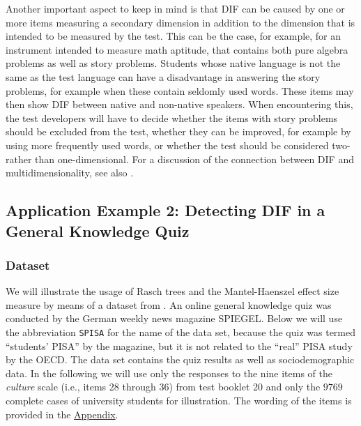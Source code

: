 \documentclass[doc,floatsintext,natbib]{apa7}
\begin{document}
Another important aspect to keep in mind is that DIF can be caused by one or more items measuring a secondary dimension in addition to the dimension that is intended to be measured by the test. This can be the case, for example, for an instrument intended to measure math aptitude, that contains both pure algebra problems as well as story problems. Students whose native language is not the same as the test language can have a disadvantage in answering the story problems, for example when these contain seldomly used words. These items may then show DIF between native and non-native speakers. When encountering this, the test developers will have to decide whether the items with story problems should be excluded from the test, whether they can be improved, for example by using more frequently used words, or whether the test should be considered two- rather than one-dimensional. For a discussion of the connection between DIF and multidimensionality, see also \cite{Ack:1992,Stretal:2021:APM}.



\subsection{Application Example 2: Detecting DIF in a General Knowledge Quiz}
\label{sec:TutorialRasch}


\subsubsection{Dataset}

We will illustrate the usage of Rasch trees and the Mantel-Haenszel effect size measure by means of a dataset from \citet{SPISA:book}. An online general knowledge quiz was conducted by the German
weekly news magazine SPIEGEL. Below we will use the abbreviation \texttt{SPISA} for the name of the data set, because the quiz was termed ``students' PISA'' by the magazine, but it is not related to the ``real'' PISA study by the OECD. The data set contains the quiz results as well as sociodemographic data. In the following we will use only the responses to the nine items of the \textit{culture} scale (i.e., items 28 through 36) from test booklet 20 and only the $9769$ complete cases of university students for illustration. The wording of the items is provided in the \hyperref[sec:AppendixA]{Appendix}.
\end{document}
